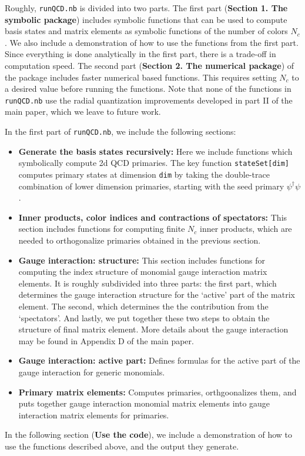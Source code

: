 \documentclass[12pt]{article}
\newcommand{\dagg}{\dagger}
\begin{document}
Roughly, {\tt runQCD.nb} is divided into two parts. The first part (\textbf{Section 1. The symbolic package}) includes symbolic functions that can be used to compute basis states and matrix elements as symbolic functions of the number of colors $N_c$. We also include a demonstration of how to use the functions from the first part. Since everything is done analytically in the first part, there is a trade-off in computation speed. The second part (\textbf{Section 2. The numerical package}) of the package includes faster numerical based functions. This requires setting $N_c$ to a desired value before running the functions. Note that none of the functions in {\tt runQCD.nb} use the radial quantization improvements developed in part II of the main paper, which we leave to future work.

In the first part of {\tt runQCD.nb}, we include the following sections:
\begin{itemize}
  \item \textbf{Generate the basis states recursively:} Here we include functions which symbolically compute 2d QCD primaries. The key function {\tt stateSet[dim]} computes primary states at dimension {\tt dim} by taking the double-trace combination of lower dimension primaries, starting with the seed primary $\psi^\dagg \psi$.
  \item \textbf{Inner products, color indices and contractions of spectators:} This section includes functions for computing finite $N_c$ inner products, which are needed to orthogonalize primaries obtained in the previous section. 
  \item \textbf{Gauge interaction: structure:} This section includes functions for computing the index structure of monomial gauge interaction matrix elements. It is roughly subdivided into three parts: the first part, which determines the gauge interaction structure for the `active' part of the matrix element. The second, which determines the the contribution from the `spectators'. And lastly, we put together these two steps to obtain the structure of final matrix element. More details about the gauge interaction may be found in Appendix D of the main paper.
  \item \textbf{Gauge interaction: active part:} Defines formulas for the active part of the gauge interaction for generic monomials.
  \item \textbf{Primary matrix elements:} Computes primaries, orthgoonalizes them, and puts together gauge interaction monomial matrix elements into gauge interaction matrix elements for primaries.
\end{itemize} In the following section (\textbf{Use the code}), we include a demonstration of how to use the functions described above, and the output they generate.
\end{document}
